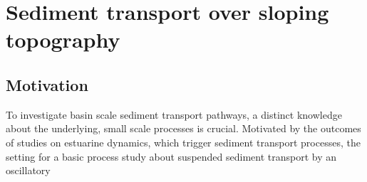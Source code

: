 \chapter{Sediment transport over sloping topography}
\label{kap-slope}

\section{Motivation}

To investigate basin scale sediment transport pathways, a distinct knowledge about the underlying, small scale processes is crucial. Motivated by the outcomes of studies on estuarine dynamics, which trigger sediment transport processes, the setting for a basic process study about suspended sediment transport by an oscillatory